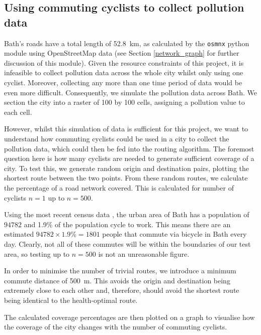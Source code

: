 \documentclass[11pt]{report}
\begin{document}
\subsection{Using commuting cyclists to collect pollution data}
% 

Bath's roads have a total length of 52.8~km, as calculated by the \texttt{osmnx} python module using OpenStreetMap data (see Section \ref{network_graph} for further discussion of this module). Given the resource constraints of this project, it is infeasible to collect pollution data across the whole city whilst only using one cyclist. Moreover, collecting any more than one time period of data would be even more difficult. Consequently, we simulate the pollution data across Bath. We section the city into a raster of 100 by 100 cells, assigning a pollution value to each cell.

However, whilst this simulation of data is sufficient for this project, we want to understand how commuting cyclists could be used in a city to collect the pollution data, which could then be fed into the routing algorithm. The foremost question here is how many cyclists are needed to generate sufficient coverage of a city. To test this, we generate random origin and destination pairs, plotting the shortest route between the two points. From these random routes, we calculate the percentage of a road network covered. This is calculated for number of cyclists $n=1$ up to $n=500$.

Using the most recent census data \citep{ons2011census}, the urban area of Bath has a population of $94782$ and 1.9\% of the population cycle to work. This means there are an estimated $94782 \times 1.9\% = 1801$ people that commute via bicycle in Bath every day. Clearly, not all of these commutes will be within the boundaries of our test area, so testing up to $n=500$ is not an unreasonable figure.

In order to minimise the number of trivial routes, we introduce a minimum commute distance of 500~m. This avoids the origin and destination being extremely close to each other and, therefore, should avoid the shortest route being identical to the health-optimal route.

The calculated coverage percentages are then plotted on a graph to visualise how the coverage of the city changes with the number of commuting cyclists.
\end{document}
